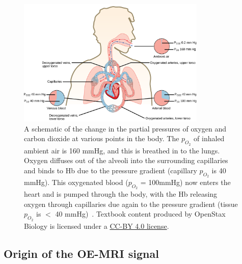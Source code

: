 \begin{figure}
    \includegraphics[width=0.8\textwidth]{./oemri_thesis1/oemri_thesis1-images/mmHg.png}
    \caption{A schematic of the change in the partial pressures of oxygen and carbon dioxide at various points in the body.
    The $p_{O_2}$ of inhaled ambient air is 160 mmHg, and this is breathed in to the lungs.
    Oxygen diffuses out of the alveoli into the surrounding capillaries and binds to Hb due to the pressure gradient (capillary $p_{O_2}$ is 40 mmHg).
    This oxygenated blood ($p_{O_2}$ = 100mmHg) now enters the heart and is pumped through the body, with the Hb releasing oxygen through capillaries due again to the pressure gradient (tissue $p_{O_2}$ is $<$ 40 mmHg)~\cite{OpenStaxBio:2016uu}. 
    Textbook content produced by OpenStax Biology is licensed under a \href{https://creativecommons.org/licenses/by/4.0/}{CC-BY 4.0 license}.}
    \label{mmhg}
\end{figure}

\subsection{Origin of the OE-MRI signal}


